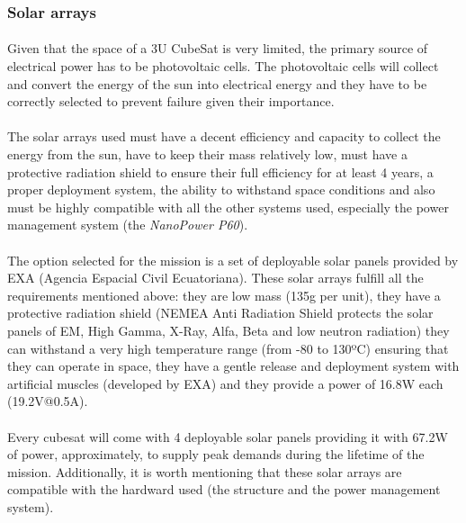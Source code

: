 \subsubsection{Solar arrays}

\paragraph{}Given that the space of a 3U CubeSat is very limited, the primary source of electrical power has to be photovoltaic cells. The photovoltaic cells will collect and convert the energy of the sun into electrical energy and they have to be correctly selected to prevent failure given their importance. 

\paragraph{}The solar arrays used must have a decent efficiency and capacity to collect the energy from the sun, have to keep their mass relatively low, must have a protective radiation shield to ensure their full efficiency for at least 4 years, a proper deployment system, the ability to withstand space conditions and also must be highly compatible with all the other systems used, especially the power management system (the \textit{NanoPower P60}).

\paragraph{}The option selected for the mission is a set of deployable solar panels provided by EXA (Agencia Espacial Civil Ecuatoriana). These solar arrays fulfill all the requirements mentioned above: they are low mass (135g per unit), they have a protective radiation shield (NEMEA Anti Radiation Shield protects the solar panels of EM, High Gamma, X-Ray, Alfa, Beta and low neutron radiation) they can withstand a very high temperature range (from -80 to 130ºC) ensuring that they can operate in space, they have a gentle release and deployment system with artificial muscles (developed by EXA) and they provide a power of 16.8W each (19.2V@0.5A).

\paragraph{}Every cubesat will come with 4 deployable solar panels providing it with 67.2W of power, approximately, to supply peak demands during the lifetime of the mission. Additionally, it is worth mentioning that these solar arrays are compatible with the hardward used (the structure and the power management system).

